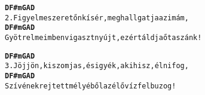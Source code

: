 \newpage
{}
\kottastart
{}
\kottaend
\begin{minipage}{\textwidth}
\begin{alltt}
\textbf{    D                   F#m         G    A    D}
2. Figyelme szeretőn kísér, meghallgatja az imám,
\textbf{     D                      F#m        G     A      D}
   Gyötrelmeimben vigaszt nyújt, ezért áldja őt a szánk!
\end{alltt}
\vspace{0.0cm}
\versszakspacing
\end{minipage}
\begin{minipage}{\textwidth}
\begin{alltt}
\textbf{    D                        F#m      G    A     D}
3. Jöjjön, ki szomjas, és igyék, aki hisz, élni fog,
\textbf{     D                    F#m     G  A        D}
   Szívének rejtett mélyéből az élő víz felbuzog!
\end{alltt}
\vspace{0.0cm}
\versszakspacing
\end{minipage}
